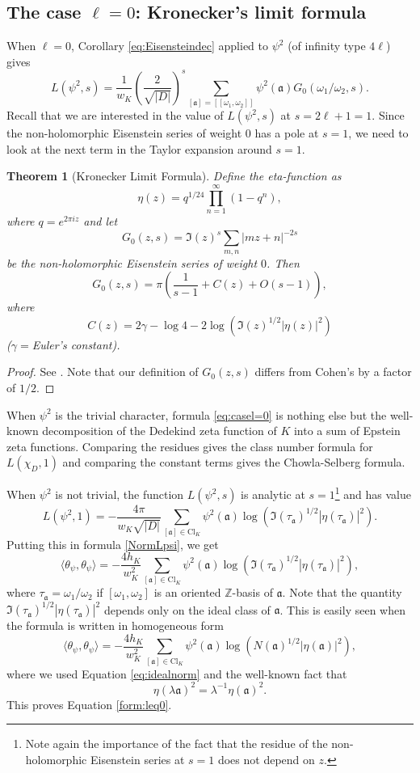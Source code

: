 \documentclass[twoside,10pt]{article}
\newtheorem{theorem}{Theorem}
\newcommand{\Z}{\mathbb{Z}}
\newcommand{\ida}{\mathfrak{a}}
\newcommand{\Clk}{\text{Cl}_K}
\newcommand{\tpsi}{\theta_\psi}
\newcommand{\latbasis}{[\omega_1,\omega_2]}
\newcommand{\omquot}{\omega_1/\omega_2}
\begin{document}
\subsection{The case $\ell=0$: Kronecker's limit formula}
When $\ell=0$, Corollary \ref{eq:Eisensteindec} applied to $\psi^2$ (of infinity type $4\ell$) gives
\begin{equation}\label{eq:casel=0}
L(\psi^2,s)=\frac{1}{w_K}\left (\frac{2}{\sqrt{|D|}}\right )^{s}\sum_{[\ida]=[\latbasis]}\psi^2(\ida)G_0(\omquot,s).
\end{equation}
Recall that we are interested in the value of $L(\psi^2,s)$ at $s=2\ell+1=1$. Since the non-holomorphic Eisenstein series of weight $0$ has a pole at $s=1$, we need to look at the next term in the Taylor expansion around $s=1$.

\begin{theorem}[Kronecker Limit Formula]
	Define the eta-function as
	\[\eta(z)=q^{1/24}\prod_{n=1}^\infty(1-q^n),\]
	where $q=e^{2\pi iz}$ and let
	\[G_0(z,s)=\Im(z)^s\sum_{m,n}|mz+n|^{-2s}\]
	be the non-holomorphic Eisenstein series of weight $0$. Then
	\[G_0(z,s)=\pi\left (\frac{1}{s-1}+C(z)+O(s-1)\right ),\]
	where
	\[C(z)=2\gamma-\log 4-2\log(\Im(z)^{1/2}|\eta(z)|^2)\]
	($\gamma=$Euler's constant).
\end{theorem}
\begin{proof}
	See \cite[Thm. 10.4.6]{Cohe}. Note that our definition of $G_0(z,s)$ differs from Cohen's by a factor of $1/2$.
\end{proof}

When $\psi^2$ is the trivial character, formula \ref{eq:casel=0} is nothing else but the well-known decomposition of the Dedekind zeta function of $K$ into a sum of Epstein zeta functions. Comparing the residues gives the class number formula for $L(\chi_D,1)$ and comparing the constant terms gives the Chowla-Selberg formula.

When $\psi^2$ is not trivial, the function $L(\psi^2,s)$ is analytic at $s=1$\footnote{Note again the importance of the fact that the residue of the non-holomorphic Eisenstein series at $s=1$ does not depend on $z$.} and has value
\[L(\psi^2,1)=-\frac{4\pi}{w_K\sqrt{|D|}}\sum_{[\ida]\in\Clk}\psi^2(\ida)\log(\Im(\tau_\ida)^{1/2}|\eta(\tau_\ida)|^2).\]
Putting this in formula \ref{NormLpsi}, we get
\begin{equation}\label{eq:filall=0}
	\langle\tpsi,\tpsi\rangle =-\frac{4h_K}{w_K^2}\sum_{[\ida]\in\Clk}\psi^2(\ida)\log(\Im(\tau_\ida)^{1/2}|\eta(\tau_\ida)|^2),
\end{equation}
where $\tau_\ida=\omega_1/\omega_2$ if $[\omega_1,\omega_2]$ is an oriented $\Z$-basis of $\ida$. Note that the quantity $\Im(\tau_\ida)^{1/2}|\eta(\tau_\ida)|^2$ depends only on the ideal class of $\ida$. This is easily seen when the formula is written in homogeneous form
\begin{equation}\label{eq:homonormell=0}
	\langle\tpsi,\tpsi\rangle =-\frac{4h_K}{w_K^2}\sum_{[\ida]\in\Clk}\psi^2(\ida)\log(N(\ida)^{1/2}|\eta(\ida)|^2),
\end{equation}
where we used Equation \ref{eq:idealnorm} and the well-known fact that
\[\eta(\lambda\ida)^2=\lambda^{-1}\eta(\ida)^2.\]
This proves Equation \ref{form:leq0}.
\end{document}
